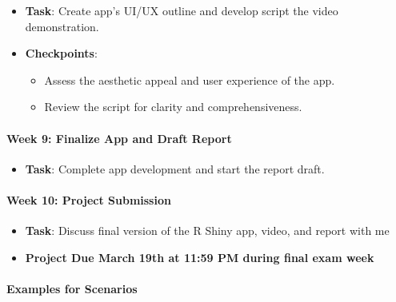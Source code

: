 \documentclass[
  letterpaper,
  DIV=11,
  numbers=noendperiod]{scrartcl}
\let\oldparagraph\paragraph
\renewcommand{\paragraph}[1]{\oldparagraph{#1}\mbox{}}
\providecommand{\tightlist}{%
  \setlength{\itemsep}{0pt}\setlength{\parskip}{0pt}}\usepackage{longtable,booktabs,array}
\begin{document}
\begin{itemize}
\tightlist
\item
  \textbf{Task}: Create app's UI/UX outline and develop script the video
  demonstration.
\item
  \textbf{Checkpoints}:

  \begin{itemize}
  \tightlist
  \item
    Assess the aesthetic appeal and user experience of the app.
  \item
    Review the script for clarity and comprehensiveness.
  \end{itemize}
\end{itemize}

\hypertarget{week-9-finalize-app-and-draft-report}{%
\paragraph{Week 9: Finalize App and Draft
Report}\label{week-9-finalize-app-and-draft-report}}

\begin{itemize}
\tightlist
\item
  \textbf{Task}: Complete app development and start the report draft.
\end{itemize}

\hypertarget{week-10-project-submission}{%
\paragraph{Week 10: Project
Submission}\label{week-10-project-submission}}

\begin{itemize}
\tightlist
\item
  \textbf{Task}: Discuss final version of the R Shiny app, video, and
  report with me
\item
  \textbf{Project Due March 19th at 11:59 PM during final exam week}
\end{itemize}

\hypertarget{examples-for-scenarios}{%
\paragraph{\texorpdfstring{\textbf{Examples for
Scenarios}}{Examples for Scenarios}}\label{examples-for-scenarios}}
\end{document}
